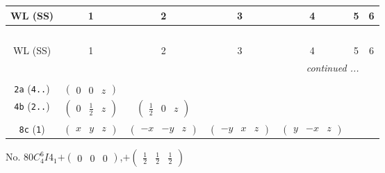 \documentclass[fleqn,9pt,landscape]{jsarticle}
\begin{document}
\begin{center}
\renewcommand{\arraystretch}{1.2}
\begin{longtable}{ccccccc}
 \hline \hline
WL (SS) & 1 & 2 & 3 & 4 & 5 & 6 \\ \hline \endfirsthead

\multicolumn{6}{l}{\tablename\ \thetable{}} \\
 \hline \hline
WL (SS) & 1 & 2 & 3 & 4 & 5 & 6 \\ \hline \endhead

 \hline \hline
\multicolumn{6}{r}{\footnotesize\it continued ...} \\ \endfoot

 \hline \hline
\multicolumn{6}{r}{} \\ \endlastfoot

{\tt 2a} ({\tt 4..}) & $ \begin{pmatrix} 0 & 0 & z \end{pmatrix} $ & $  $ & $  $ & $  $ \\ \hline
{\tt 4b} ({\tt 2..}) & $ \begin{pmatrix} 0 & \frac{1}{2} & z \end{pmatrix} $ & $ \begin{pmatrix} \frac{1}{2} & 0 & z \end{pmatrix} $ & $  $ & $  $ \\ \hline
{\tt 8c} ({\tt 1}) & $ \begin{pmatrix} x & y & z \end{pmatrix} $ & $ \begin{pmatrix} - x & - y & z \end{pmatrix} $ & $ \begin{pmatrix} - y & x & z \end{pmatrix} $ & $ \begin{pmatrix} y & - x & z \end{pmatrix} $ \\
\end{longtable}
\end{center}
\newpage
No. 80\quad$C_{4}^{6}$\quad$I4_1$\quad[ tetragonal ]\quad$+\begin{pmatrix} 0 & 0 & 0 \end{pmatrix}$,\quad $+\begin{pmatrix} \frac{1}{2} & \frac{1}{2} & \frac{1}{2} \end{pmatrix}$
\end{document}
